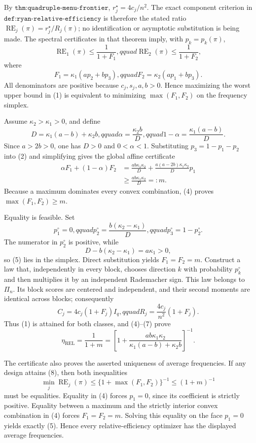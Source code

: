 By \(\texttt{thm:quadruple-menu-frontier}\), \(r_j^\star=4c_j/n^2\).  The exact component criterion in \(\texttt{def:ryan-relative-efficiency}\) is therefore the stated ratio \(\operatorname{RE}_j(\pi)=r_j^\star/R_j(\pi)\); no identification or asymptotic substitution is being made.  The spectral certificates in that theorem imply, with \(p_k=p_k(\pi)\),
\[
\operatorname{RE}_1(\pi)
\le\frac1{1+F_1},qquad
\operatorname{RE}_2(\pi)
\le\frac1{1+F_2}, \tag{1}
\]
where
\[
F_1=\kappa_1(ap_2+bp_3),qquad
F_2=\kappa_2(ap_1+bp_3). \tag{2}
\]
All denominators are positive because \(c_j,s_j,a,b>0\).  Hence maximizing the worst upper bound in (1) is equivalent to minimizing \(\max(F_1,F_2)\) on the frequency simplex.

Assume \(\kappa_2>\kappa_1>0\), and define
\[
D=\kappa_1(a-b)+\kappa_2b,qquad
\alpha=\frac{\kappa_2b}{D},qquad
1-\alpha=\frac{\kappa_1(a-b)}D. \tag{3}
\]
Since \(a>2b>0\), one has \(D>0\) and \(0<\alpha<1\).  Substituting \(p_3=1-p_1-p_2\) into (2) and simplifying gives the global affine certificate
\[
\begin{aligned}
\alpha F_1+(1-\alpha)F_2
&=\frac{ab\kappa_1\kappa_2}{D}
+\frac{a(a-2b)\kappa_1\kappa_2}{D}p_1\\
&\ge \frac{ab\kappa_1\kappa_2}{D}=:m. 
\end{aligned} \tag{4}
\]
Because a maximum dominates every convex combination, (4) proves \(\max(F_1,F_2)\ge m\).

Equality is feasible.  Set
\[
p_1^\circ=0,qquad
p_2^\circ=\frac{b(\kappa_2-\kappa_1)}D,qquad
p_3^\circ=1-p_2^\circ. \tag{5}
\]
The numerator in \(p_2^\circ\) is positive, while
\[
D-b(\kappa_2-\kappa_1)=a\kappa_1>0, \tag{6}
\]
so (5) lies in the simplex.  Direct substitution yields \(F_1=F_2=m\).  Construct a law that, independently in every block, chooses direction \(k\) with probability \(p_k^\circ\) and then multiplies it by an independent Rademacher sign.  This law belongs to \(\Pi_n\).  Its block scores are centered and independent, and their second moments are identical across blocks; consequently
\[
C_j=4c_j(1+F_j)I_q,qquad
R_j=\frac{4c_j}{n^2}(1+F_j). \tag{7}
\]
Thus (1) is attained for both classes, and (4)--(7) prove
\[
\eta_{\mathrm{REL}}
=\frac1{1+m}
=\left[1+\frac{ab\kappa_1\kappa_2}{\kappa_1(a-b)+\kappa_2b}\right]^{-1}. \tag{8}
\]

The certificate also proves the asserted uniqueness of average frequencies.  If any design attains (8), then both inequalities
\[
\min_j\operatorname{RE}_j(\pi)
\le\{1+\max(F_1,F_2)\}^{-1}
\le(1+m)^{-1} \tag{9}
\]
must be equalities.  Equality in (4) forces \(p_1=0\), since its coefficient is strictly positive.  Equality between a maximum and the strictly interior convex combination in (4) forces \(F_1=F_2=m\).  Solving this equality on the face \(p_1=0\) yields exactly (5).  Hence every relative-efficiency optimizer has the displayed average frequencies.

